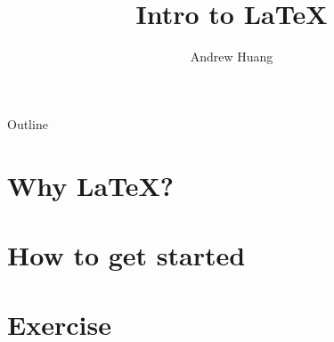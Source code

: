 \documentclass[aspectratio=169]{beamer}
\title{Intro to \LaTeX}
\author{Andrew Huang}
\institute[University of Melbourne]
\begin{document}
\begin{frame}
    \maketitle
\end{frame}

\begin{frame}{Outline}
	\tableofcontents
\end{frame}

\section{Why \LaTeX?}


\section{How to get started}


\section{Exercise}

\end{document}
